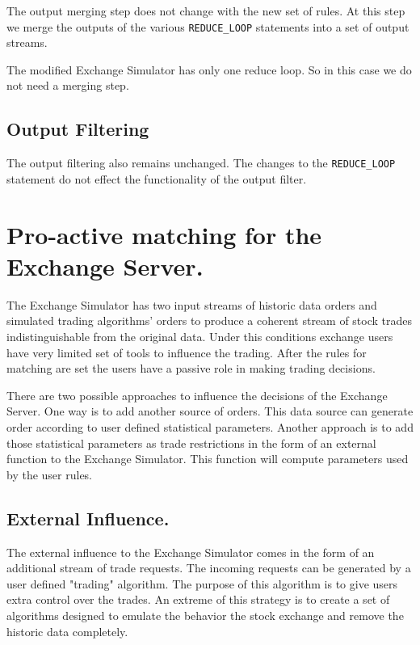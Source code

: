 \documentclass{article}
\begin{document}
The output merging step does not change with the new set of rules. At this step we merge the outputs of the various {\tt REDUCE\_LOOP} statements into a set of output streams.

The modified Exchange Simulator has only one reduce loop. So in this case we do not need a merging step.

\subsection{Output Filtering}

The output filtering also remains unchanged. The changes to the {\tt REDUCE\_LOOP} statement do not effect the functionality of the output filter.  

\section{Pro-active matching for the Exchange Server.}

The Exchange Simulator has two input streams of historic data orders and simulated trading algorithms' orders to produce a coherent stream of stock trades indistinguishable from the original data. Under this conditions exchange users have very limited set of tools to influence the trading. After the rules for matching are set the users have a passive role in making trading decisions. 

There are two possible approaches to influence the decisions of the Exchange Server. One way is to add another source of orders. This data source can generate order according to user defined statistical parameters. Another approach is to add those statistical parameters as trade restrictions in the form of an external function to the Exchange Simulator. This function will compute parameters used by the user rules.

\subsection{External Influence.}

The external influence to the Exchange Simulator comes in the form of an additional stream of trade requests. The incoming requests can be generated by a user defined "trading" algorithm. The purpose of this algorithm is to give users extra control over the trades. An extreme of this strategy is to create a set of algorithms designed to emulate the behavior the stock exchange and remove the historic data completely. 
\end{document}
